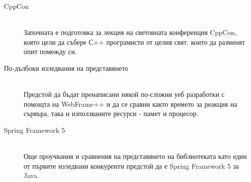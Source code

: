 \documentclass[documentation.tex]{subfiles}
\begin{document}
\begin{description}
	\item[CppCon \cite{cppcon}] \hfill \\ 
	Започната е подготовка за лекция на световната конференция CppCon, която цели да събере С++ програмисти от целия свят, които да разменят опит помежду си.
	\item[По-дълбоки изледвания на представянето]\hfill \\
	Предстой да бъдат пренаписани някой по-сложни уеб разработки с помощта на WebFrame++ и да се сравни както времето за реакция на сървъра, така и използваните ресурси - памет и процесор.
	\item[Spring Framework 5 \cite{spring}] \hfill \\ 
	Още проучвания и сравнения на представянето на библиотеката като един от първите изледвани конкуренти предстой да е Spring Framework 5 за Java.
\end{description}
\end{document}
